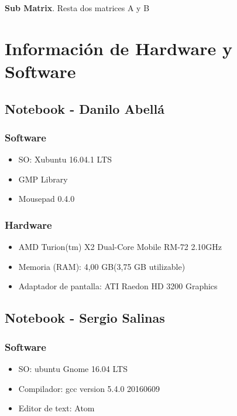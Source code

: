 \documentclass[12pt,letterpaper]{scrartcl}
\begin{document}
 \begin{algorithm}[H]
 
 \caption{\textbf{Sub Matrix}. Resta dos matrices A y B}
\end{algorithm}

\newpage



\section{Información de Hardware y Software}


\subsection{ Notebook - Danilo Abellá}
\subsubsection{Software}
\begin{itemize}
\item SO: Xubuntu 16.04.1 LTS
\item GMP Library
\item Mousepad 0.4.0
\end{itemize}

\subsubsection{Hardware}
\begin{itemize}
\item AMD Turion(tm) X2 Dual-Core Mobile RM-72 2.10GHz
\item Memoria (RAM): 4,00 GB(3,75 GB utilizable)
\item Adaptador de pantalla: ATI Raedon HD 3200 Graphics
\end{itemize}



\subsection{Notebook - Sergio Salinas}
\subsubsection{Software}
\begin{itemize}
\item  SO: ubuntu Gnome 16.04 LTS
\item Compilador: gcc version 5.4.0 20160609
\item Editor de text: Atom
\end{itemize}
\end{document}
